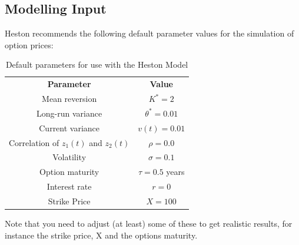 \documentclass{article}
\begin{document}
\subsection{Modelling Input}
Heston recommends the following default parameter values for the simulation of option prices:
\begin{table}[]
    \centering
    \begin{tabular}{c|c}
     \textbf{Parameter} & \textbf{Value} \\
    Mean reversion & $K^{*}=2$ \\
    Long-run variance & $\theta^{*}=0.01$ \\
    Current variance & $v(t) = 0.01$ \\
    Correlation of $z_{1}(t)$ and $z_{2}(t)$ & $\rho = 0.0$ \\
    Volatility & $\sigma = 0.1$ \\
    Option maturity & $\tau = 0.5$ years\\
    Interest rate & $r=0$ \\
    Strike Price & $X=100$ \\
    \end{tabular}
    \caption{Default parameters for use with the Heston Model}
    \label{tab:tab1}
\end{table}
Note that you need to adjust (at least) some of these to get realistic results, for instance the strike price, X and the options maturity.  
\printbibliography
\end{document}
